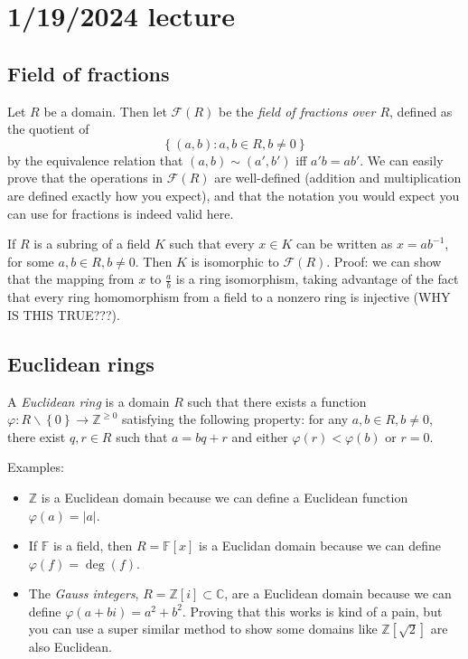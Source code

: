 \documentclass[12pt]{article}
\begin{document}
\section{1/19/2024 lecture}
\subsection{Field of fractions}
Let $R$ be a domain. Then let $\mathcal{F}(R)$ be the \textit{field of fractions over $R$}, defined as the quotient of
\[ \left\{ (a,b): a,b \in R, b \neq 0 \right\} \]
by the equivalence relation that $(a,b) \sim (a',b')$ iff $a'b=ab'$. We can easily prove that the operations in $\mathcal{F}(R)$ are well-defined (addition and multiplication are defined exactly how you expect), and that the notation you would expect you can use for fractions is indeed valid here.
\par
If $R$ is a subring of a field $K$ such that every $x \in K$ can be written as $x = ab^{-1}$, for some $a,b \in R, b \neq 0$. Then $K$ is isomorphic to $\mathcal{F}(R)$. Proof: we can show that the mapping from $x$ to $\frac{a}{b}$ is a ring isomorphism, taking advantage of the fact that every ring homomorphism from a field to a nonzero ring is injective (WHY IS THIS TRUE???).

\subsection{Euclidean rings}
A \textit{Euclidean ring} is a domain $R$ such that there exists a function $\varphi : R \backslash \left\{ 0 \right\} \rightarrow \mathbb{Z}^{\geq 0}$ satisfying the following property: for any $a,b \in R, b\neq 0$, there exist $q,r \in R$ such that $a=bq+r$ and either $\varphi(r) < \varphi(b)$ or $r=0$.
\par
Examples:
\begin{itemize}
    \item $\mathbb{Z}$ is a Euclidean domain because we can define a Euclidean function $\varphi(a) = |a|$.
    \item If $\mathbb{F}$ is a field, then $R= \mathbb{F}[x]$ is a Euclidan domain because we can define $\varphi(f) = \operatorname{deg}(f)$.
    \item The \textit{Gauss integers}, $R = \mathbb{Z}[i] \subset \mathbb{C}$, are a Euclidean domain because we can define $\varphi(a+bi)=a^2+b^2$. Proving that this works is kind of a pain, but you can use a super similar method to show some domains like $\mathbb{Z}[\sqrt{2}]$ are also Euclidean.
\end{itemize}
\end{document}
